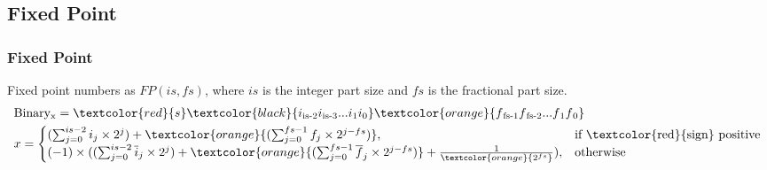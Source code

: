 \subsection{Fixed Point}
\begin{frame}
    \frametitle{Fixed Point}
    Fixed point numbers as $FP(is, fs)$, where $is$ is the integer part size and $fs$ is the fractional part size.
    \begin{equation}
        \begin{aligned}
            &\text{Binary}\textsubscript{x}=\textcolor{red}{s}\textcolor{black}{i\textsubscript{is-2}i\textsubscript{is-3}...i\textsubscript{1}i\textsubscript{0}}\textcolor{orange}{f\textsubscript{fs-1}f\textsubscript{fs-2}...f\textsubscript{1}f\textsubscript{0}}\\
            &x=\begin{cases}
                    (\sum_{j=0}^{is-2} i_j \times 2^j) + \textcolor{orange}{(\sum_{j=0}^{fs-1} f_j \times 2^{j-fs})},& \text{if \textcolor{red}{sign} positive} \\
                    (-1) \times ((\sum_{j=0}^{is-2} \overline{i}_j \times 2^j) + \textcolor{orange}{(\sum_{j=0}^{fs-1} \overline{f}_j \times 2^{j-fs})} + \frac{1}{ \textcolor{orange}{2^{fs}}}), & \text{otherwise}
            \end{cases}
        \end{aligned}
    \end{equation}
\end{frame}



